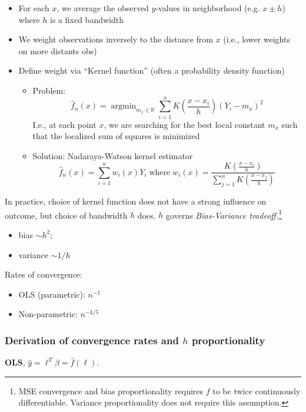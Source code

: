 \documentclass[11pt, %
	oneside, %
	english, %
	onehalfspacing, %
	]{article} %
\numberwithin{equation}{section}
\begin{document}
\begin{itemize}
    \item For each $x$, we average the observed $y$-values in neighborhood (e.g. $x \pm h$) where $h$ is a fixed bandwidth
    \item We weight observations inversely to the distance from $x$ (i.e., lower weights on more distants obs)
    \item Define weight via ``Kernel function'' (often a probability density function)
    \begin{itemize}
        \item Problem:
        $$
        \hat{f}_n(x)=\operatorname{argmin}_{m_x \in \mathbb{R}} \sum_{i=1}^n K\left(\frac{x-x_i}{h}\right)\left(Y_i-m_x\right)^2
        $$
        I.e., at each point $x$, we are searching for the best local constant $m_x$ such that the localized sum of squares is minimized
        \item Solution: Nadaraya-Watson kernel estimator
        $$
        \hat{f}_n(x)=\sum_{i=1}^n w_i(x) Y_i \; \text{where} \; w_i(x)=\frac{K\left(\frac{x-x_i}{h}\right)}{\sum_{j=1}^n K\left(\frac{x-x_j}{h}\right)}
        $$
    \end{itemize}
\end{itemize}

In practice, choice of kernel function does not have a strong influence on outcome, but choice of bandwidth $h$ does. $h$ governs \emph{Bias-Variance tradeoff.}\footnote{MSE convergence and bias proportionality requires $f$ to be twice continuously differentiable. Variance proportionality does not require this assumption.}
\begin{itemize}
    \item bias $\sim h^2$;
    \item variance $\sim 1/h$
\end{itemize}
Rates of convergence:
\begin{itemize}
    \item OLS (parametric): $n^{-1}$
    \item Non-parametric: $n^{-4/5}$
\end{itemize}


\subsubsection*{Derivation of convergence rates and $h$ proportionality}

\noindent\textbf{OLS}, $\hat{y} = \ell^T \beta = \hat{f}(\ell)$.
\end{document}
